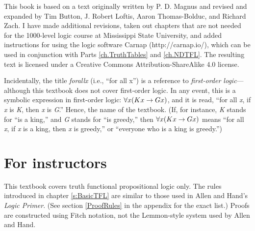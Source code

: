 
This book is based on a text originally written by P. D. Magnus and revised and expanded by Tim Button, J. Robert Loftis, Aaron Thomas-Bolduc, and Richard Zach. I have made additional revisions, taken out chapters that are not needed for the 1000-level logic course at Mississippi State University, and added instructions for using the logic software Carnap (http://carnap.io/), which can be used in conjunction with Parts \ref{ch.TruthTables} and \ref{ch.NDTFL}. The resulting text is licensed under a Creative Commons Attribution-ShareAlike 4.0 license.

Incidentally, the title \textit{forall\hspace{.10em}x} (i.e., ``for all x'') is a reference to \textit{first-order logic}---although this textbook does not cover first-order logic. In any event, this is a symbolic expression in first-order logic: $\forall x(Kx \rightarrow Gx)$, and it is read, “for all \textit{x}, if \textit{x} is \textit{K}, then \textit{x} is \textit{G}.” Hence, the name of the textbook. (If, for instance, \textit{K} stands for ``is a king,'' and \textit{G} stands for ``is greedy,'' then $\forall x(Kx \rightarrow Gx)$ means ``for all \textit{x}, if \textit{x} is a king, then \textit{x} is greedy,'' or ``everyone who is a king is greedy.'') 


\section{For instructors}

This textbook covers truth functional propositional logic only. The rules introduced in chapter \ref{s:BasicTFL} are similar to those used in Allen and Hand's \textit{Logic Primer}. (See section \ref{ProofRules} in the appendix for the exact list.) Proofs are constructed using Fitch notation, not the Lemmon-style system used by Allen and Hand.